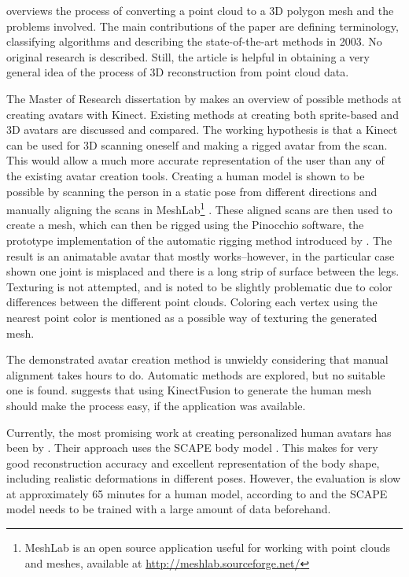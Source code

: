 \citet{fabio2003point} overviews the process of converting a point cloud to a 3D polygon mesh and the problems involved. The main contributions of the paper are defining terminology, classifying algorithms and describing the state-of-the-art methods in 2003. No original research is described. Still, the article is helpful in obtaining a very general idea of the process of 3D reconstruction from point cloud data.

\newtopic

The Master of Research dissertation by \citet{charpentier2011accurate} makes an overview of possible methods at creating avatars with Kinect. Existing methods at creating both sprite-based and 3D avatars are discussed and compared. The working hypothesis is that a Kinect can be used for 3D scanning oneself and making a rigged avatar from the scan. This would allow a much more accurate representation of the user than any of the existing avatar creation tools. Creating a human model is shown to be possible by scanning the person in a static pose from different directions and manually aligning the scans in MeshLab\footnote{MeshLab is an open source application useful for working with point clouds and meshes, available at \url{http://meshlab.sourceforge.net/}} \citep{meshlab}. These aligned scans are then used to create a mesh, which can then be rigged using the Pinocchio software, the prototype implementation of the automatic rigging method introduced by \citep{baran2007automatic}. The result is an animatable avatar that mostly works--however, in the particular case shown one joint is misplaced and there is a long strip of surface between the legs. Texturing is not attempted, and is noted to be slightly problematic due to color differences between the different point clouds. Coloring each vertex using the nearest point color is mentioned as a possible way of texturing the generated mesh. \citep{charpentier2011accurate}

The demonstrated avatar creation method is unwieldy considering that manual alignment takes hours to do. Automatic methods are explored, but no suitable one is found. \citeauthor{charpentier2011accurate} suggests that using KinectFusion to generate the human mesh should make the process easy, if the application was available. \citep{charpentier2011accurate}

\newtopic

Currently, the most promising work at creating personalized human avatars has been by \citet{weiss2011home}. Their approach uses the SCAPE body model \citep{anguelov2005scape}. This makes for very good reconstruction accuracy and excellent representation of the body shape, including realistic deformations in different poses. However, the evaluation is slow at approximately 65 minutes for a human model, according to \citet{weiss2011home} and the SCAPE model needs to be trained with a large amount of data beforehand.

